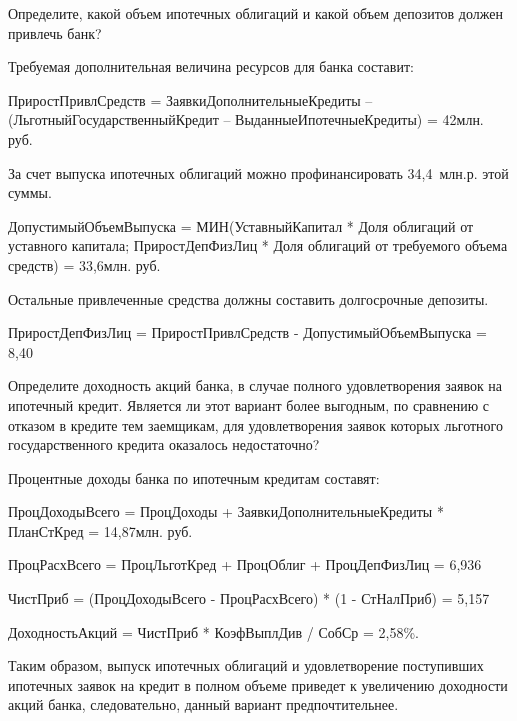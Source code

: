 \documentclass[12pt, table, a4paper,twoside]{exam}
\begin{document}
\begin{questions}
\begin{subparts}
	Определите, какой объем ипотечных облигаций и какой объем депозитов должен привлечь банк?
	
	\begin{solution}[12em]
		
		Требуемая дополнительная величина ресурсов для банка составит:
		
		ПриростПривлСредств = ЗаявкиДополнительныеКредиты – (ЛьготныйГосударственныйКредит – ВыданныеИпотечныеКредиты) = 42млн. руб.
		
		За счет выпуска ипотечных облигаций можно профинансировать 34,4~млн.р. этой суммы.
		
		ДопустимыйОбъемВыпуска = МИН(УставныйКапитал * Доля облигаций от уставного капитала; ПриростДепФизЛиц * Доля облигаций от требуемого объема средств) = 33,6млн. руб.
		
		Остальные привлеченные средства должны составить долгосрочные депозиты.
		
		ПриростДепФизЛиц = ПриростПривлСредств - ДопустимыйОбъемВыпуска = 8,40	
		
	\end{solution}

	\subpart[10] Определите доходность акций банка, в случае полного удовлетворения заявок на ипотечный кредит. Является ли этот вариант более выгодным, по сравнению с отказом в кредите тем заемщикам, для удовлетворения заявок которых льготного государственного кредита оказалось недостаточно?

	\begin{solution}[12em]
		
		Процентные доходы банка по ипотечным кредитам составят:
		
		ПроцДоходыВсего = ПроцДоходы + ЗаявкиДополнительныеКредиты * ПланСтКред	 = 14,87млн. руб.
		
		ПроцРасхВсего = ПроцЛьготКред + ПроцОблиг + ПроцДепФизЛиц = 6,936
		
		ЧистПриб = (ПроцДоходыВсего - ПроцРасхВсего) * (1 - СтНалПриб) = 5,157
		
		ДоходностьАкций = ЧистПриб * КоэфВыплДив / СобСр = 2,58\%.
		
		Таким образом, выпуск ипотечных облигаций и удовлетворение поступивших ипотечных заявок на кредит в полном объеме приведет к увеличению доходности акций банка, следовательно, данный вариант предпочтительнее.
		
	\end{solution}
	
\end{subparts}
\addpoints


\end{questions}
\end{document}
